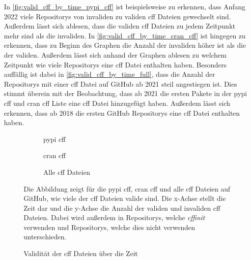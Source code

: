 In \autoref{fig:valid_cff_by_time_pypi_cff} ist beispielsweise zu erkennen, dass Anfang 2022 viele Repositorys von invaliden zu validen \gls{cff} Dateien gewechselt sind.
Außerdem lässt sich ablesen, dass die validen \gls{cff} Dateien zu jedem Zeitpunkt mehr sind als die invaliden.
In \autoref{fig:valid_cff_by_time_cran_cff} ist hingegen zu erkennen, dass zu Beginn des Graphen die Anzahl der invaliden höher ist als die der validen.
Außerdem lässt sich anhand der Graphen ablesen zu welchem Zeitpunkt wie viele Repositorys eine \gls{cff} Datei enthalten haben.
Besonders auffällig ist dabei in \autoref{fig:valid_cff_by_time_full}, dass die Anzahl der Repositorys mit einer \gls{cff} Datei auf GitHub ab 2021 steil angestiegen ist.
Dies stimmt überein mit der Beobachtung, dass ab 2021 die ersten Pakete in der \gls{pypi} \gls{cff} und \gls{cran} \gls{cff} Liste eine \gls{cff} Datei hinzugefügt haben.
Außerdem lässt sich erkennen, dass ab 2018 die ersten GitHub Repositorys eine \gls{cff} Datei enthalten haben.

\begin{figure}
    \begin{subfigure}{.5\textwidth}
        \centering
        
        \caption{\gls{pypi} \gls{cff}}
        \label{fig:valid_cff_by_time_pypi_cff}
    \end{subfigure}%
    \begin{subfigure}{.5\textwidth}
        \centering
        
        \caption{\gls{cran} \gls{cff}}
        \label{fig:valid_cff_by_time_cran_cff}
    \end{subfigure}
    \centering
    \begin{subfigure}{.5\textwidth}
        \centering
        
        \caption{Alle \gls{cff} Dateien}
        \label{fig:valid_cff_by_time_full}
    \end{subfigure}
    \caption{Validität der \gls{cff} Dateien über die Zeit}
    \label{fig:valid_cff_by_time}
    \small
    \raggedright
    Die Abbildung zeigt für die \gls{pypi} \gls{cff}, \gls{cran} \gls{cff} und alle \gls{cff} Dateien auf GitHub, wie viele der \gls{cff} Dateien valide sind. Die x-Achse stellt die Zeit dar und die y-Achse die Anzahl der validen und invaliden \gls{cff} Dateien. Dabei wird außerdem in Repositorys, welche \emph{cffinit} verwenden und Repositorys, welche dies nicht verwenden unterschieden.
\end{figure}

